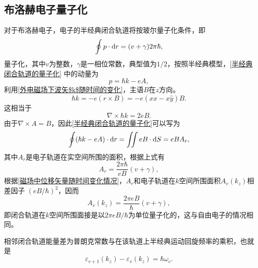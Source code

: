         \subsection{布洛赫电子量子化}
            对于布洛赫电子，电子的半经典闭合轨道将按玻尔量子化条件，即
            \begin{equation}
                \oint p\cdot\mathop{}\!\mathrm{d} r=(v+\gamma)2\pi\hbar\label{半经典闭合轨道的量子化},
            \end{equation}
            量子化，其中$v$为整数，$\gamma$是一相位常数，典型值为$1/2$，按照半经典模型，\autoref{半经典闭合轨道的量子化}
            中的动量为
            \begin{equation}
                p=\hbar k-eA,
            \end{equation}
            利用\autoref{外电磁场下波矢$k$随时间的变化}，主语$B$在$z$方向。
            \begin{equation}
                \hbar k=-e(r\times B)=-e(x\hat{x}-x\hat{y})B.
            \end{equation}
            这相当于
            \begin{equation}
                \nabla\times\hbar k=2eB.
            \end{equation}
            由于$\nabla\times A=B$，因此\autoref{半经典闭合轨道的量子化}可以写为
            \begin{equation}
                \oint(\hbar k-eA)\cdot\mathop{}\!\mathrm{d} r=\iint eB\cdot\mathop{}\!\mathrm{d} S=eBA_r,
            \end{equation}
            其中$A_r$是电子轨道在实空间所围的面积，根据上式有
            \begin{equation}
                A_r=\frac{2\pi \hbar}{eB}(v+\gamma),
            \end{equation}
            根据\autoref{磁场中位移矢量随时间变化情况}，$A_r$和电子轨道在$k$空间所围面积$A_v(k_z)$相差因子
            $(eB/\hbar)^2$，因而
            \begin{equation}
                A_v(k_z)=\frac{2\pi eB}{\hbar}(v+\gamma)\label{闭合轨道在k空间所围面积},
            \end{equation}
            即闭合轨道在$k$空间所围面接是以$2\pi eB/\hbar$为单位量子化的，这与自由电子的情况相同。

            相邻闭合轨道能量差为普朗克常数与在该轨道上半经典运动回旋频率的乘积，也就是
            \begin{equation}
                \varepsilon_{v+1}(k_z)-\varepsilon_v(k_z)=\hbar\omega_c.
            \end{equation}
